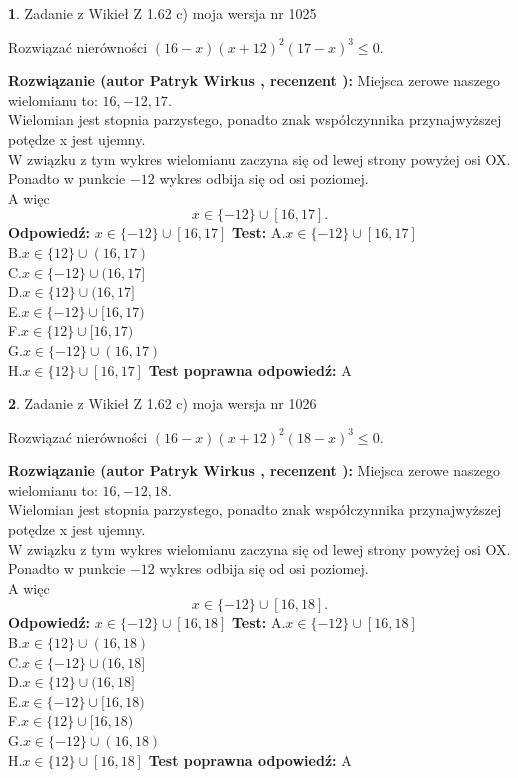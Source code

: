 \documentclass[12pt, a4paper]{article}
\theoremstyle{definition} %
\newtheorem{zad}{}
\newcommand{\zadStart}[1]{\begin{zad}#1\newline}
\newcommand{\zadStop}{\end{zad}}
\newcommand{\rozwStart}[2]{\noindent \textbf{Rozwiązanie (autor #1 , recenzent #2): }\newline}
\newcommand{\rozwStop}{\newline}
\newcommand{\odpStart}{\noindent \textbf{Odpowiedź:}\newline}
\newcommand{\odpStop}{\newline}
\newcommand{\testStart}{\noindent \textbf{Test:}\newline}
\newcommand{\testStop}{\newline}
\newcommand{\kluczStart}{\noindent \textbf{Test poprawna odpowiedź:}\newline}
\newcommand{\kluczStop}{\newline}
\begin{document}
\zadStart{Zadanie z Wikieł Z 1.62 c) moja wersja nr 1025}

Rozwiązać nierówności $(16-x)(x+12)^{2}(17-x)^{3}\le0$.
\zadStop
\rozwStart{Patryk Wirkus}{}
Miejsca zerowe naszego wielomianu to: $16, -12, 17$.\\
Wielomian jest stopnia parzystego, ponadto znak współczynnika przy\linebreak najwyższej potędze x jest ujemny.\\ W związku z tym wykres wielomianu zaczyna się od lewej strony powyżej osi OX.\\
Ponadto w punkcie $-12$ wykres odbija się od osi poziomej.\\
A więc $$x \in \{-12\} \cup [16,17].$$
\rozwStop
\odpStart
$x \in \{-12\} \cup [16,17]$
\odpStop
\testStart
A.$x \in \{-12\} \cup [16,17]$\\
B.$x \in \{12\} \cup (16,17)$\\
C.$x \in \{-12\} \cup (16,17]$\\
D.$x \in \{12\} \cup (16,17]$\\
E.$x \in \{-12\} \cup [16,17)$\\
F.$x \in \{12\} \cup [16,17)$\\
G.$x \in \{-12\} \cup (16,17)$\\
H.$x \in \{12\} \cup [16,17]$
\testStop
\kluczStart
A
\kluczStop



\zadStart{Zadanie z Wikieł Z 1.62 c) moja wersja nr 1026}

Rozwiązać nierówności $(16-x)(x+12)^{2}(18-x)^{3}\le0$.
\zadStop
\rozwStart{Patryk Wirkus}{}
Miejsca zerowe naszego wielomianu to: $16, -12, 18$.\\
Wielomian jest stopnia parzystego, ponadto znak współczynnika przy\linebreak najwyższej potędze x jest ujemny.\\ W związku z tym wykres wielomianu zaczyna się od lewej strony powyżej osi OX.\\
Ponadto w punkcie $-12$ wykres odbija się od osi poziomej.\\
A więc $$x \in \{-12\} \cup [16,18].$$
\rozwStop
\odpStart
$x \in \{-12\} \cup [16,18]$
\odpStop
\testStart
A.$x \in \{-12\} \cup [16,18]$\\
B.$x \in \{12\} \cup (16,18)$\\
C.$x \in \{-12\} \cup (16,18]$\\
D.$x \in \{12\} \cup (16,18]$\\
E.$x \in \{-12\} \cup [16,18)$\\
F.$x \in \{12\} \cup [16,18)$\\
G.$x \in \{-12\} \cup (16,18)$\\
H.$x \in \{12\} \cup [16,18]$
\testStop
\kluczStart
A
\kluczStop
\end{document}
